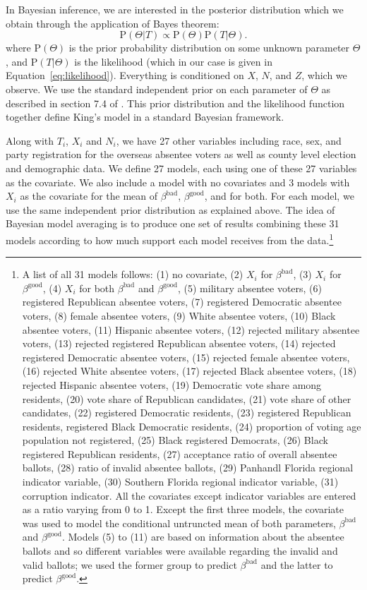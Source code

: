 \documentclass[11pt,titlepage]{article}
\renewcommand{\P}{\text{P}}
\newcommand{\bb}{\beta^{\text{bad}}}
\newcommand{\bg}{\beta^{\text{good}}}
\begin{document}
In Bayesian inference, we are interested in the posterior distribution
which we obtain through the application of Bayes theorem:
\begin{equation}
  \P(\Theta|T) \propto \P(\Theta)\P(T|\Theta).\label{eq:post}
\end{equation}
where $\P(\Theta)$ is the prior probability distribution on some
unknown parameter $\Theta$, and $\P(T|\Theta)$ is the likelihood
(which in our case is given in Equation~\ref{eq:likelihood}).
Everything is conditioned on $X$, $N$, and $Z$, which we observe. We
use the standard independent prior on each parameter of $\Theta$ as
described in section 7.4 of \citet{king:97}.  This prior distribution
and the likelihood function together define King's model in a standard
Bayesian framework.

Along with $T_i$, $X_i$ and $N_i$, we have 27 other variables
including race, sex, and party registration for the overseas absentee
voters as well as county level election and demographic data.  We
define 27 models, each using one of these 27 variables as the
covariate.  We also include a model with no covariates and 3 models
with $X_i$ as the covariate for the mean of $\bb$, $\bg$, and for
both.  For each model, we use the same independent prior distribution
as explained above. The idea of Bayesian model averaging is to produce
one set of results combining these 31 models according to how much
support each model receives from the data.\footnote{\label{f:models}A
  list of all 31 models follows: (1) no covariate, (2) $X_i$ for
  $\bb$, (3) $X_i$ for $\bg$, (4) $X_i$ for both $\bb$ and $\bg$, (5)
  military absentee voters, (6) registered Republican absentee voters,
  (7) registered Democratic absentee voters, (8) female absentee
  voters, (9) White absentee voters, (10) Black absentee voters, (11)
  Hispanic absentee voters, (12) rejected military absentee voters,
  (13) rejected registered Republican absentee voters, (14) rejected
  registered Democratic absentee voters, (15) rejected female absentee
  voters, (16) rejected White absentee voters, (17) rejected Black
  absentee voters, (18) rejected Hispanic absentee voters, (19)
  Democratic vote share among residents, (20) vote share of Republican
  candidates, (21) vote share of other candidates, (22) registered
  Democratic residents, (23) registered Republican residents,
  registered Black Democratic residents, (24) proportion of voting age
  population not registered, (25) Black registered Democrats, (26)
  Black registered Republican residents, (27) acceptance ratio of
  overall absentee ballots, (28) ratio of invalid absentee ballots,
  (29) Panhandl Florida regional indicator variable, (30) Southern
  Florida regional indicator variable, (31) corruption indicator. All
  the covariates except indicator variables are entered as a ratio
  varying from 0 to 1.  Except the first three models, the covariate
  was used to model the conditional untruncted mean of both
  parameters, $\bb$ and $\bg$.  Models (5) to (11) are based on
  information about the absentee ballots and so different variables
  were available regarding the invalid and valid ballots; we used the
  former group to predict $\bb$ and the latter to predict $\bg$.}
\end{document}
